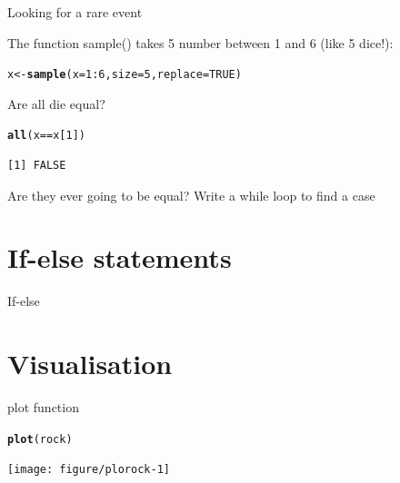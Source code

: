 \documentclass[10pt]{beamer}\usepackage[]{graphicx}\usepackage[]{color}
\makeatletter
\newcommand{\hlnum}[1]{\textcolor[rgb]{0.686,0.059,0.569}{#1}}%
\newcommand{\hlopt}[1]{\textcolor[rgb]{0,0,0}{#1}}%
\newcommand{\hlstd}[1]{\textcolor[rgb]{0.345,0.345,0.345}{#1}}%
\newcommand{\hlkwb}[1]{\textcolor[rgb]{0.69,0.353,0.396}{#1}}%
\newcommand{\hlkwc}[1]{\textcolor[rgb]{0.333,0.667,0.333}{#1}}%
\newcommand{\hlkwd}[1]{\textcolor[rgb]{0.737,0.353,0.396}{\textbf{#1}}}%
\newenvironment{kframe}{%
 \def\at@end@of@kframe{}%
 \ifinner\ifhmode%
  \def\at@end@of@kframe{\end{minipage}}%
  \begin{minipage}{\columnwidth}%
 \fi\fi%
 \def\FrameCommand##1{\hskip\@totalleftmargin \hskip-\fboxsep
 \colorbox{shadecolor}{##1}\hskip-\fboxsep
     \hskip-\linewidth \hskip-\@totalleftmargin \hskip\columnwidth}%
 \MakeFramed {\advance\hsize-\width
   \@totalleftmargin\z@ \linewidth\hsize
   \@setminipage}}%
 {\par\unskip\endMakeFramed%
 \at@end@of@kframe}
\newenvironment{knitrout}{}{} %
\makeatother
\begin{document}
\begin{frame}[fragile]{Looking for a rare event}

The function sample() takes 5 number between 1 and 6 (like 5 dice!):
\begin{knitrout}
\color{fgcolor}\begin{kframe}
\begin{alltt}
\hlstd{x} \hlkwb{<-} \hlkwd{sample}\hlstd{(}\hlkwc{x} \hlstd{=} \hlnum{1}\hlopt{:}\hlnum{6}\hlstd{,} \hlkwc{size} \hlstd{=} \hlnum{5}\hlstd{,} \hlkwc{replace} \hlstd{=} \hlnum{TRUE}\hlstd{)}
\end{alltt}
\end{kframe}
\end{knitrout}

Are all die equal?
\begin{knitrout}
\color{fgcolor}\begin{kframe}
\begin{alltt}
\hlkwd{all}\hlstd{(x} \hlopt{==} \hlstd{x[}\hlnum{1}\hlstd{])}
\end{alltt}
\begin{verbatim}
[1] FALSE
\end{verbatim}
\end{kframe}
\end{knitrout}

Are they ever going to be equal?
Write a while loop to find a case


\end{frame}

\section{If-else statements}

\begin{frame}{If-else}

\end{frame}



\section{Visualisation}

\begin{frame}[fragile]{plot function}

\begin{knitrout}
\color{fgcolor}\begin{kframe}
\begin{alltt}
\hlkwd{plot}\hlstd{(rock)}
\end{alltt}
\end{kframe}
\texttt{[image: figure/plorock-1]} 

\end{knitrout}

\end{frame}
\end{document}
